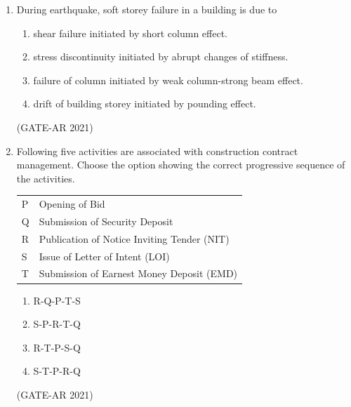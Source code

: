 \documentclass[a4paper,10pt]{article}
\begin{document}
\begin{enumerate}
    \item During earthquake, soft storey failure in a building is due to 
    \begin{enumerate}
        \item shear failure initiated by short column effect.
        \item stress discontinuity initiated by abrupt changes of stiffness.
        \item failure of column initiated by weak column-strong beam effect.
        \item drift of building storey initiated by pounding effect.
    \end{enumerate}
    \hfill (GATE-AR 2021)

    \item Following five activities are associated with construction contract management. Choose the option showing the correct progressive sequence of the activities. \\
    \begin{tabular}{ l l }
    P & Opening of Bid \\
    Q & Submission of Security Deposit \\
    R & Publication of Notice Inviting Tender (NIT) \\
    S & Issue of Letter of Intent (LOI) \\
    T & Submission of Earnest Money Deposit (EMD) \\
    \end{tabular}
    \begin{multicols}{2}
    \begin{enumerate}
        \item R-Q-P-T-S
        \item S-P-R-T-Q
        \item R-T-P-S-Q
        \item S-T-P-R-Q
    \end{enumerate}
    \end{multicols}
    \hfill (GATE-AR 2021)


\end{enumerate}
\end{document}
